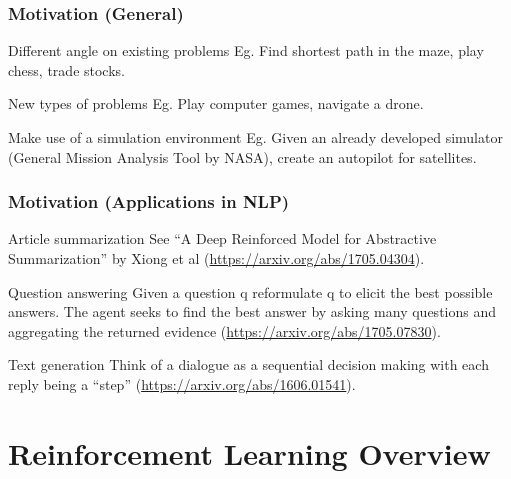 \documentclass{beamer}
\begin{document}

\begin{frame}
\frametitle{Motivation (General)}
\begin{block}{Different angle on existing problems}
Eg. Find shortest path in the maze, play chess, trade stocks. 
\end{block}

\begin{block}{New types of problems}
Eg. Play computer games, navigate a drone.
\end{block}

\begin{block}{Make use of a simulation environment}
Eg. Given an already developed 
simulator (General Mission Analysis Tool by NASA), 
create an autopilot 
for satellites.
\end{block}
\end{frame}


\begin{frame}
\frametitle{Motivation (Applications in NLP)}
\begin{block}{Article summarization}
	See ``A Deep Reinforced Model for Abstractive Summarization''
	by Xiong et al (\url{https://arxiv.org/abs/1705.04304}). 
\end{block}

\begin{block}{Question answering}
	Given a question q reformulate q to elicit the best possible answers. The agent seeks to
	find the best answer by asking many questions and aggregating the returned evidence (\url{https://arxiv.org/abs/1705.07830}).
\end{block}

\begin{block}{Text generation}
	Think of a dialogue as a sequential decision 
	making with each reply being a ``step''  (\url{https://arxiv.org/abs/1606.01541}).
\end{block}
\end{frame}


\section{Reinforcement Learning Overview}
\end{document}
